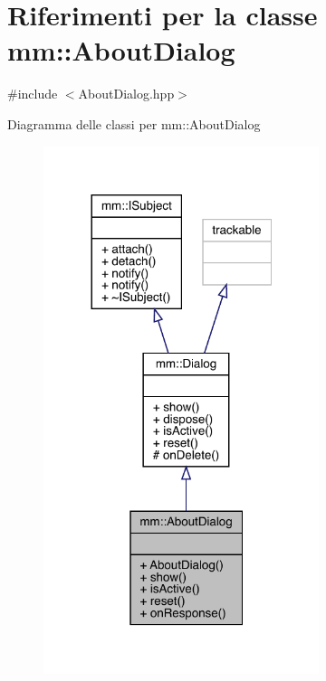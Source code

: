 \hypertarget{classmm_1_1_about_dialog}{}\section{Riferimenti per la classe mm\+:\+:About\+Dialog}
\label{classmm_1_1_about_dialog}


{\ttfamily \#include $<$About\+Dialog.\+hpp$>$}



Diagramma delle classi per mm\+:\+:About\+Dialog
\nopagebreak
\begin{figure}[H]
\begin{center}
\leavevmode
\includegraphics[width=228pt]{d1/dfc/classmm_1_1_about_dialog__inherit__graph}
\end{center}
\end{figure}


